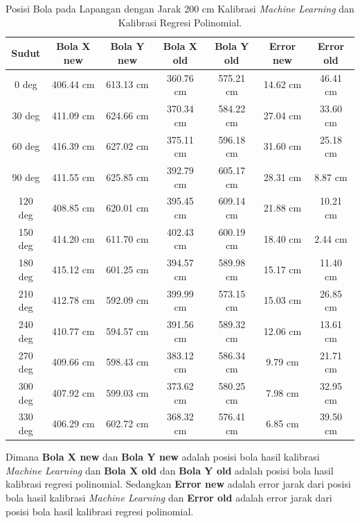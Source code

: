 \begin{longtable}{|c|c|c|c|c|c|c|}
  \caption{Posisi Bola pada Lapangan dengan Jarak 200 cm Kalibrasi \emph{Machine Learning} dan Kalibrasi Regresi Polinomial.}
  \label{tb:posisibolalapangan200}                                   \\
  \hline
  \rowcolor[HTML]{C0C0C0}
  \textbf{Sudut} & \textbf{Bola X new} & \textbf{Bola Y new} & \textbf{Bola X old} & \textbf{Bola Y old} & \textbf{Error new} & \textbf{Error old} \\
  \hline
  0 deg   & 406.44 cm  & 613.13 cm    & 360.76 cm & 575.21 cm & 14.62 cm & 46.41 cm \\
  30 deg  & 411.09 cm  & 624.66 cm    & 370.34 cm & 584.22 cm & 27.04 cm & 33.60 cm \\
  60 deg  & 416.39 cm  & 627.02 cm    & 375.11 cm & 596.18 cm & 31.60 cm & 25.18 cm \\
  90 deg  & 411.55 cm  & 625.85 cm    & 392.79 cm & 605.17 cm & 28.31 cm & 8.87 cm \\
  120 deg & 408.85 cm  & 620.01 cm    & 395.45 cm & 609.14 cm & 21.88 cm & 10.21 cm \\
  150 deg & 414.20 cm  & 611.70 cm    & 402.43 cm & 600.19 cm & 18.40 cm & 2.44 cm \\
  180 deg & 415.12 cm  & 601.25 cm    & 394.57 cm & 589.98 cm & 15.17 cm & 11.40 cm \\
  210 deg & 412.78 cm  & 592.09 cm    & 399.99 cm & 573.15 cm & 15.03 cm & 26.85 cm \\
  240 deg & 410.77 cm  & 594.57 cm    & 391.56 cm & 589.32 cm & 12.06 cm & 13.61 cm \\
  270 deg & 409.66 cm  & 598.43 cm    & 383.12 cm & 586.34 cm & 9.79 cm & 21.71 cm \\
  300 deg & 407.92 cm  & 599.03 cm    & 373.62 cm & 580.25 cm & 7.98 cm & 32.95 cm \\
  330 deg & 406.29 cm  & 602.72 cm    & 368.32 cm & 576.41 cm & 6.85 cm & 39.50 cm \\
  \hline
\end{longtable}

Dimana \textbf{Bola X new} dan \textbf{Bola Y new} adalah posisi bola hasil kalibrasi \emph{Machine Learning} dan \textbf{Bola X old} dan \textbf{Bola Y old} adalah posisi bola hasil kalibrasi regresi polinomial. Sedangkan \textbf{Error new} adalah error jarak dari posisi bola hasil kalibrasi \emph{Machine Learning} dan \textbf{Error old} adalah error jarak dari posisi bola hasil kalibrasi regresi polinomial.


